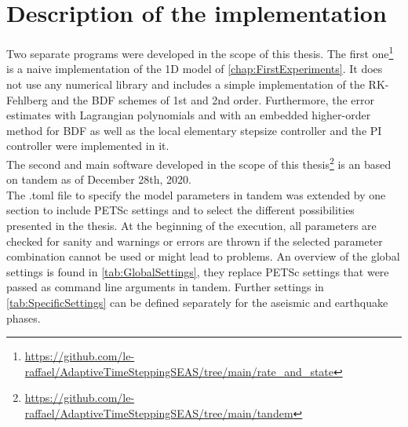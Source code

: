 \chapter{Description of the implementation}
Two separate programs were developed in the scope of this thesis. The first one\footnote{\url{https://github.com/le-raffael/AdaptiveTimeSteppingSEAS/tree/main/rate\_and\_state}} is a naive implementation of the 1D model of \autoref{chap:FirstExperiments}. It does not use any numerical library and includes a simple implementation of the RK-Fehlberg and the BDF schemes of 1st and 2nd order. Furthermore, the error estimates with Lagrangian polynomials and with an embedded higher-order method for BDF as well as the local elementary stepsize controller and the PI controller were implemented in it. \\
The second and main software developed in the scope of this thesis\footnote{\url{https://github.com/le-raffael/AdaptiveTimeSteppingSEAS/tree/main/tandem}} is an based on {\ttfamily tandem} as of December 28th, 2020. \\
The {\ttfamily .toml} file to specify the model parameters in {\ttfamily tandem} was extended by one section to include PETSc settings and to select the different possibilities presented in the thesis. At the beginning of the execution, all parameters are checked for sanity and warnings or errors are thrown if the selected parameter combination cannot be used or might lead to problems. An overview of the global settings is found in \autoref{tab:GlobalSettings}, they replace PETSc settings that were passed as command line arguments in {\ttfamily tandem}. Further settings in \autoref{tab:SpecificSettings} can be defined separately for the aseismic and earthquake phases.

